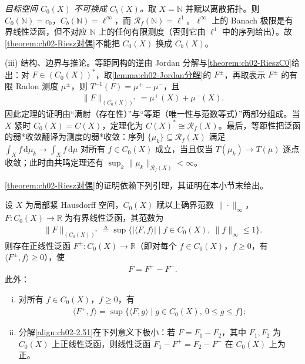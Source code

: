 \documentclass[../../main.tex]{subfiles}%
\begin{document}
\begin{remark}
\emph{目标空间 $C_0(X)$ 不可换成 $C_b(X)$。}取 $X=\mathbb N$ 并赋以离散拓扑。则 $C_0(\mathbb N)=c_0$，$C_b(\mathbb N)=\ell^\infty$，而 $\mathscr R_f(\mathbb N)=\ell^1$。$\ell^\infty$ 上的 Banach 极限是有界线性泛函，但不对应 $\mathbb N$ 上的任何有限测度（否则它由 $\ell^1$ 中的序列给出）。故\cref{theorem:ch02-Riesz对偶}不能把 $C_0(X)$ 换成 $C_b(X)$。

(iii) 结构、边界与推论。等距同构的逆由 Jordan 分解与\cref{theorem:ch02-RieszC0}给出：对 $F\in(C_0(X))^*$，取\cref{lemma:ch02-Jordan分解}的 $F^\pm$，再取表示 $F^\pm$ 的有限 Radon 测度 $\mu^\pm$，则 $T^{-1}(F)=\mu^+-\mu^-$，且
\begin{align*}
\|F\|_{(C_0(X))^*}=\mu^+(X)+\mu^-(X).
\end{align*}
因此定理的证明由“满射（存在性）”与“等距（唯一性与范数等式）”两部分组成。当 $X$ 紧时 $C_0(X)=C(X)$，定理化为 $C(X)^*\cong\mathscr R_f(X)$。最后，等距性把泛函的弱*收敛翻译为测度的弱*收敛：序列 $\{\mu_k\}\subseteq\mathscr R_f(X)$ 满足 $\int_Xf\,\mathrm{d}\mu_k\to\int_Xf\,\mathrm{d}\mu$ 对所有 $f\in C_0(X)$ 成立，当且仅当 $T(\mu_k)\to T(\mu)$ 逐点收敛；此时由共鸣定理还有 $\sup_k\|\mu_k\|_{\mathscr R_f(X)}<\infty$。
\end{remark}

\cref{theorem:ch02-Riesz对偶}的证明依赖下列引理，其证明在本小节末给出。

\begin{lemma}[Jordan 分解]\label{lemma:ch02-Jordan分解}
设 $X$ 为局部紧 Hausdorff 空间，$C_0(X)$ 赋以上确界范数 $\|\cdot\|_\infty$，$F:C_0(X)\to\mathbb R$ 为有界线性泛函，其范数为
\begin{align*}
\|F\|_{(C_0(X))^*}\triangleq\sup\{|\langle F,f\rangle|\mid f\in C_0(X),\ \|f\|_\infty\leqslant1\}.
\end{align*}
则存在正线性泛函 $F^\pm:C_0(X)\to\mathbb R$（即对每个 $f\in C_0(X)$，$f\geqslant0$，有 $\langle F^\pm,f\rangle\geqslant0$），使
\begin{align}
F=F^+-F^-. \label{align:ch02-2.51}
\end{align}
此外：
\begin{enumerate}[(i)]
\item 对所有 $f\in C_0(X)$，$f\geqslant0$，有
\begin{align}
\langle F^+,f\rangle=\sup\{\langle F,g\rangle\mid g\in C_0(X),\ 0\leqslant g\leqslant f\}; \label{align:ch02-2.52}
\end{align}
\item 分解\eqref{align:ch02-2.51}在下列意义下极小：若 $F=F_1-F_2$，其中 $F_1,F_2$ 为 $C_0(X)$ 上正线性泛函，则线性泛函 $F_1-F^+=F_2-F^-$ 在 $C_0(X)$ 上为正。
\end{enumerate}
\end{lemma}
\end{document}
